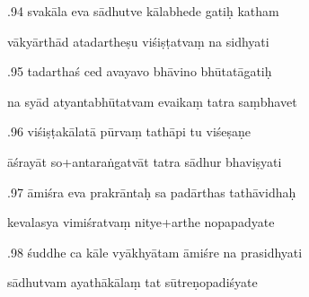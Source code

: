 \documentclass[article,12pt,a4paper]{memoir}%
\newcounter{parCount}
\begin{document}
	  
	  \pstart {}.94 svakāla eva sādhutve kālabhede gatiḥ katham 
	{}
	\pend%
      

	  
	  \pstart \leavevmode%
	vākyārthād atadartheṣu viśiṣṭatvaṃ na sidhyati 
	{}
	\pend%
      

	  
	  \pstart {}.95 tadarthaś ced avayavo bhāvino bhūtatāgatiḥ 
	{}
	\pend%
      

	  
	  \pstart \leavevmode%
	na syād atyantabhūtatvam evaikaṃ tatra saṃbhavet 
	{}
	\pend%
      

	  
	  \pstart {}.96 viśiṣṭakālatā pūrvaṃ tathāpi tu viśeṣaṇe 
	{}
	\pend%
      

	  
	  \pstart \leavevmode%
	āśrayāt so+antaraṅgatvāt tatra sādhur bhaviṣyati 
	{}
	\pend%
      

	  
	  \pstart {}.97 āmiśra eva prakrāntaḥ sa padārthas tathāvidhaḥ 
	{}
	\pend%
      

	  
	  \pstart \leavevmode%
	kevalasya vimiśratvaṃ nitye+arthe nopapadyate 
	{}
	\pend%
      

	  
	  \pstart {}.98 śuddhe ca kāle vyākhyātam āmiśre na prasidhyati 
	{}
	\pend%
      

	  
	  \pstart \leavevmode%
	sādhutvam ayathākālaṃ tat sūtreṇopadiśyate 
	{}
	\pend%
      
\end{document}
